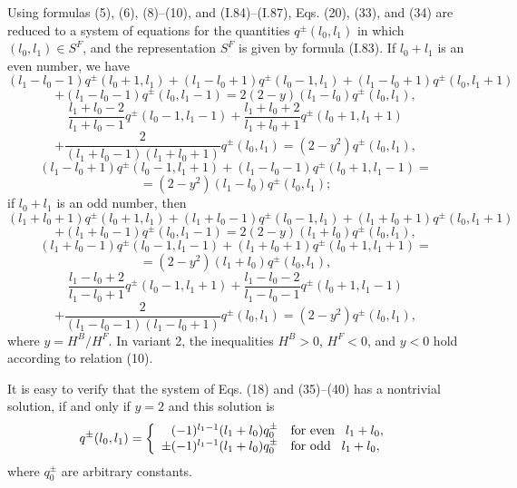 \documentclass[a4paper,12pt]{article}
\begin{document}
Using formulas (5), (6), (8)--(10), and (I.84)--(I.87), Eqs. (20), (33), and
(34) are reduced to a system of equations for the quantities 
$q^{\pm}(l_{0},l_{1})$ in which 
$(l_{0},l_{1}) \in S^{F}$, and the representation $S^{F}$ is given by formula 
(I.83). If $l_{0}+l_{1}$ is an even number, we have
$$(l_{1}-l_{0}-1)q^{\pm}(l_{0}+1,l_{1}) + (l_{1}-l_{0}+1)q^{\pm}(l_{0}-1,l_{1})
+ (l_{1}-l_{0}+1)q^{\pm}(l_{0},l_{1}+1)$$
\begin{equation}
+ (l_{1}-l_{0}-1)q^{\pm}(l_{0},l_{1}-1)
= 2(2-y)(l_{1}-l_{0})q^{\pm}(l_{0},l_{1}),
\end{equation}
$$\frac{l_{1}+l_{0}-2}{l_{1}+l_{0}-1} q^{\pm}(l_{0}-1,l_{1}-1)
+\frac{l_{1}+l_{0}+2}{l_{1}+l_{0}+1} q^{\pm}(l_{0}+1,l_{1}+1)$$
\begin{equation}
+\frac{2}{(l_{1}+l_{0}-1)(l_{1}+l_{0}+1)} q^{\pm}(l_{0},l_{1})
=(2-y^{2})q^{\pm}(l_{0},l_{1}),
\end{equation}
$$(l_{1}-l_{0}+1)q^{\pm}(l_{0}-1,l_{1}+1)
+(l_{1}-l_{0}-1)q^{\pm}(l_{0}+1,l_{1}-1)=$$
\begin{equation}
= (2-y^{2})(l_{1}-l_{0}) q^{\pm}(l_{0},l_{1});
\end{equation}
if $l_{0}+l_{1}$ is an odd number, then
$$(l_{1}+l_{0}+1)q^{\pm}(l_{0}+1,l_{1})
+ (l_{1}+l_{0}-1)q^{\pm}(l_{0}-1,l_{1})
+ (l_{1}+l_{0}+1)q^{\pm}(l_{0},l_{1}+1)$$
\begin{equation}
+ (l_{1}+l_{0}-1)q^{\pm}(l_{0},l_{1}-1) 
= 2(2-y)(l_{1}+l_{0})q^{\pm} (l_{0},l_{1}),
\end{equation}
$$(l_{1}+l_{0}-1)q^{\pm}(l_{0}-1,l_{1}-1)
+(l_{1}+l_{0}+1)q^{\pm}(l_{0}+1,l_{1}+1)=$$
\begin{equation}
= (2-y^{2})(l_{1}+l_{0}) q^{\pm}(l_{0},l_{1}),
\end{equation}
$$\frac{l_{1}-l_{0}+2}{l_{1}-l_{0}+1} q^{\pm}(l_{0}-1,l_{1}+1)
+\frac{l_{1}-l_{0}-2}{l_{1}-l_{0}-1} q^{\pm}(l_{0}+1,l_{1}-1)$$
\begin{equation}
+\frac{2}{(l_{1}-l_{0}-1)(l_{1}-l_{0}+1)} q^{\pm}(l_{0},l_{1})
=(2-y^{2})q^{\pm}(l_{0},l_{1}),
\end{equation}
where $y=H^{B}/H^{F}$. In variant 2, the inequalities $H^{B} > 0$, $H^{F} < 0$,
and $y < 0$ hold according to relation (10).

It is easy to verify that the system of Eqs. (18) and (35)--(40) has a
nontrivial solution, if and only if $y=2$ and this solution is
\begin{equation}
q^{\pm}(l_{0},l_{1}) = \left\{ \begin{array}{rl}
(-1)^{l_{1}-1} (l_{1}+l_{0}) q^{\pm}_{0} & 
{\mbox{\rm for even}} \hspace{0.3 cm} l_{1}+l_{0},\\
\pm (-1)^{l_{1}-1} (l_{1}+l_{0}) q^{\pm}_{0} & 
{\mbox{\rm for odd}} \hspace{0.3 cm} l_{1}+l_{0},
\end{array} \right.
\end{equation}
where $q^{\pm}_{0}$ are arbitrary constants. 
\end{document}
